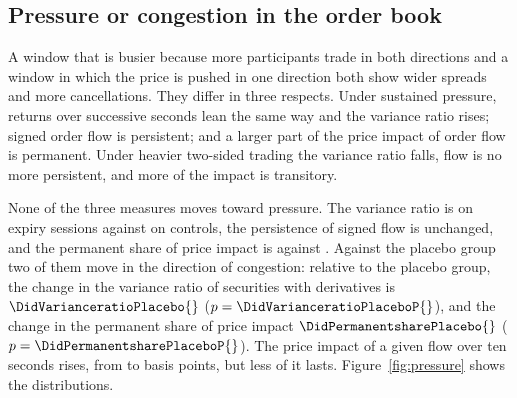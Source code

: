 \begin{table}[htbp]
\centering
\small
\caption{Order imbalance in the settlement window. Order imbalance is
$(BI - SI)/(BI + SI)$, where $BI$ and $SI$ are buyer- and seller-initiated volume. The first
three panels report coefficients on indicators for the session type with security fixed
effects; the last column is the difference between the securities with derivatives and the
placebo group, with security and session fixed effects. The last panel regresses the imbalance
of each five-minute block on that of the previous block, with interactions for the session
types. Standard errors clustered by session in parentheses.}
\label{tab:pressure}
\resizebox{\textwidth}{!}{}
\end{table}

\subsection{Pressure or congestion in the order book}

A window that is busier because more participants trade in both directions and a window in
which the price is pushed in one direction both show wider spreads and more cancellations.
They differ in three respects. Under sustained pressure, returns over successive seconds lean
the same way and the variance ratio rises; signed order flow is persistent; and a larger part
of the price impact of order flow is permanent. Under heavier two-sided trading the variance
ratio falls, flow is no more persistent, and more of the impact is transitory.

None of the three measures moves toward pressure. The variance ratio is
\VarianceRatioExpiry{} on expiry sessions against \VarianceRatioControl{} on controls, the
persistence of signed flow is unchanged, and the permanent share of price impact is
\ImpactPermanentShareExpiry{} against \ImpactPermanentShareControl{}. Against the placebo group
two of them move in the direction of congestion: relative to the placebo group, the change in the
variance ratio of securities with derivatives is $\DidVarianceratioPlacebo{}$
($p = \DidVarianceratioPlaceboP{}$), and the change in the permanent share of price impact
$\DidPermanentsharePlacebo{}$ ($p = \DidPermanentsharePlaceboP{}$). The price impact of a given flow over ten seconds rises,
from \ImpactShortBpsControl{} to \ImpactShortBpsExpiry{} basis points, but less of it lasts.
Figure~\ref{fig:pressure} shows the distributions.

